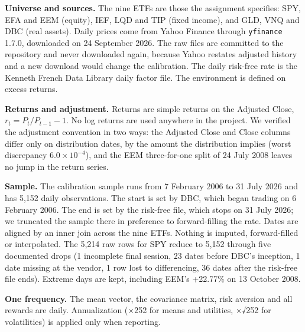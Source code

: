 \documentclass[
  11pt]{article}
\begin{document}
\textbf{Universe and sources.} The nine ETFs are those the assignment
specifies: SPY, EFA and EEM (equity), IEF, LQD and TIP (fixed income),
and GLD, VNQ and DBC (real assets). Daily prices come from Yahoo Finance
through \texttt{yfinance} 1.7.0, downloaded on 24 September 2026. The
raw files are committed to the repository and never downloaded again,
because Yahoo restates adjusted history and a new download would change
the calibration. The daily risk-free rate is the Kenneth French Data
Library daily factor file. The environment is defined on excess returns.

\textbf{Returns and adjustment.} Returns are simple returns on the
Adjusted Close, \(r_t = P_t / P_{t-1} - 1\). No log returns are used
anywhere in the project. We verified the adjustment convention in two
ways: the Adjusted Close and Close columns differ only on distribution
dates, by the amount the distribution implies (worst discrepancy
\(6.0 \times 10^{-4}\)), and the EEM three-for-one split of 24 July 2008
leaves no jump in the return series.

\textbf{Sample.} The calibration sample runs from 7 February 2006 to 31
July 2026 and has 5,152 daily observations. The start is set by DBC,
which began trading on 6 February 2006. The end is set by the risk-free
file, which stops on 31 July 2026; we truncated the sample there in
preference to forward-filling the rate. Dates are aligned by an inner
join across the nine ETFs. Nothing is imputed, forward-filled or
interpolated. The 5,214 raw rows for SPY reduce to 5,152 through five
documented drops (1 incomplete final session, 23 dates before DBC's
inception, 1 date missing at the vendor, 1 row lost to differencing, 36
dates after the risk-free file ends). Extreme days are kept, including
EEM's +22.77\% on 13 October 2008.

\textbf{One frequency.} The mean vector, the covariance matrix, risk
aversion and all rewards are daily. Annualization (×252 for means and
utilities, ×√252 for volatilities) is applied only when reporting.
\end{document}
